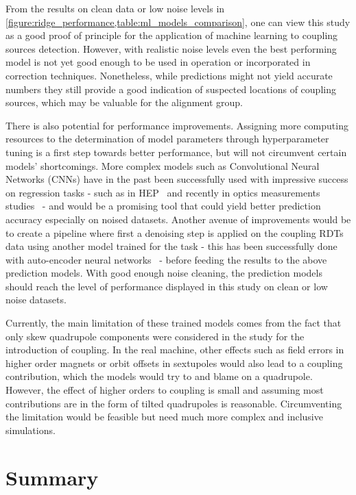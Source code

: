 From the results on clean data or low noise levels in \cref{figure:ridge_performance,table:ml_models_comparison}, one can view this study as a good proof of principle for the application of machine learning to coupling sources detection.
However, with realistic noise levels even the best performing model is not yet good enough to be used in operation or incorporated in correction techniques.
Nonetheless, while predictions might not yield accurate numbers they still provide a good indication of suspected locations of coupling sources, which may be valuable for the alignment group.

There is also potential for performance improvements.
Assigning more computing resources to the determination of model parameters through hyperparameter tuning is a first step towards better performance, but will not circumvent certain models' shortcomings.
More complex models such as Convolutional Neural Networks (CNNs) have in the past been successfully used with impressive success on regression tasks - such as in \acrshort{HEP}~\cite{JOI:Aurisano:Convolutional_Neural_Network_Neutrino_Event_Classifier} and recently in optics measurements studies~\cite{IPAC:Fol:Optics_Corrections_Using_Machine_Learning_in_the_LHC} - and would be a promising tool that could yield better prediction accuracy especially on noised datasets.
Another avenue of improvements would be to create a pipeline where first a denoising step is applied on the coupling RDTs data using another model trained for the task - this has been successfully done with auto-encoder neural networks~\cite{IPAC:Fol:Denoising_Optics_Measurements_Autoencoder_Neural_Networks} - before feeding the results to the above prediction models.
With good enough noise cleaning, the prediction models should reach the level of performance displayed in this study on clean or low noise datasets.

Currently, the main limitation of these trained models comes from the fact that only skew quadrupole components were considered in the study for the introduction of coupling.
In the real machine, other effects such as field errors in higher order magnets or orbit offsets in sextupoles would also lead to a coupling contribution, which the models would try to and blame on a quadrupole.
However, the effect of higher orders to coupling is small and assuming most contributions are in the form of tilted quadrupoles is reasonable.
Circumventing the limitation would be feasible but need much more complex and inclusive simulations.

\section{Summary}
\label{section:ml_conclusions_outlooks}

